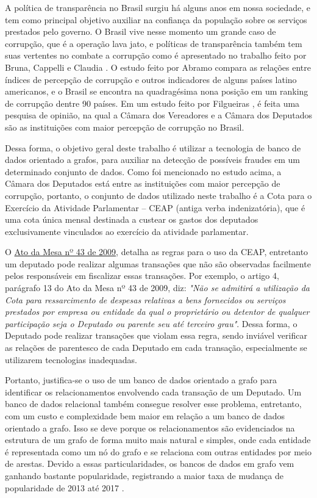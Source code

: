 \label{chap:1}

	A política de transparência no Brasil surgiu há alguns anos em nossa sociedade, e tem como principal objetivo auxiliar na confiança da população sobre os serviços prestados pelo governo. O Brasil vive nesse momento um grande caso de corrupção, que é a operação lava jato, e políticas de transparência também tem suas vertentes no combate a corrupção como é apresentado no trabalho feito por Bruna, Cappelli e Claudia \cite{diirrcombate}. O estudo feito por Abramo \cite{abramo2000relaccoes} compara as relações entre índices de percepção de corrupção
e outros indicadores de alguns países latino americanos, e o Brasil se encontra na quadragésima nona posição em um ranking de corrupção dentre 90 países. Em um estudo feito por Filgueiras \cite{filgueiras2009tolerancia}, é feita uma pesquisa de opinião, na qual a Câmara dos Vereadores e a Câmara dos Deputados são as instituições com maior percepção de corrupção no Brasil.

	Dessa forma, o objetivo geral deste trabalho é utilizar a tecnologia de banco de dados orientado a grafos, para auxiliar na detecção de possíveis fraudes em um determinado conjunto de dados. Como foi mencionado no estudo acima, a Câmara dos Deputados está entre as instituições com maior percepção de corrupção, portanto, o conjunto de dados utilizado neste trabalho é a Cota para o Exercício da Atividade Parlamentar – CEAP (antiga verba indenizatória), que é uma cota única mensal destinada a custear os gastos dos deputados exclusivamente vinculados ao exercício da atividade parlamentar.
	
	O \href{http://www2.camara.leg.br/legin/int/atomes/2009/atodamesa-43-21-maio-2009-588364-norma-cd-mesa.html}{Ato da Mesa nº 43 de 2009}, detalha as regras para o uso da CEAP, entretanto um deputado pode realizar algumas transações que não são observadas facilmente pelos responsáveis em fiscalizar essas transações. Por exemplo, o artigo 4, parágrafo 13 do Ato da Mesa nº 43 de 2009, diz: \textit{"Não se admitirá a utilização da Cota para ressarcimento de despesas relativas  a bens fornecidos ou serviços prestados por empresa ou entidade da qual o proprietário ou detentor de qualquer participação seja o Deputado ou parente seu até terceiro grau"}. Dessa forma, o Deputado pode realizar transações que violam essa regra, sendo inviável verificar as relações de parentesco de cada Deputado em cada transação, especialmente se utilizarem tecnologias inadequadas.
	
	Portanto, justifica-se o uso de um banco de dados orientado a grafo para identificar os relacionamentos envolvendo cada transação de um Deputado. Um banco de dados relacional também consegue resolver esse problema, entretanto, com um custo e complexidade bem maior em relação a um banco de dados orientado a grafo. Isso se deve porque os relacionamentos são evidenciados na estrutura de um grafo de forma muito mais natural e simples, onde cada entidade é representada como um nó do grafo e se relaciona com outras entidades por meio de arestas. Devido a essas particularidades, os bancos de dados em grafo vem ganhando bastante popularidade, registrando a maior taxa de mudança de popularidade de 2013 até 2017 \cite{Dbmspopularity}.
	
